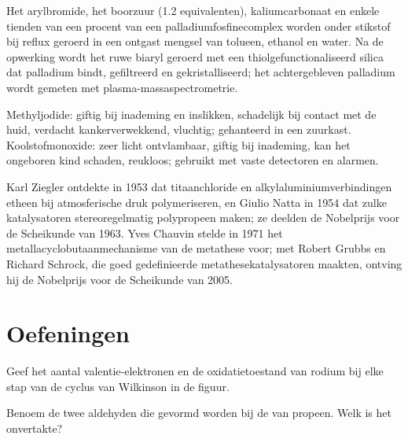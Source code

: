 \begin{inthelab}
Het arylbromide, het boorzuur (1.2 equivalenten), kaliumcarbonaat en
enkele tienden van een procent van een palladiumfosfinecomplex worden
onder stikstof bij reflux geroerd in een ontgast mengsel van tolueen,
ethanol en water. Na de opwerking wordt het ruwe biaryl geroerd met een
thiolgefunctionaliseerd silica dat palladium bindt, gefiltreerd en
gekristalliseerd; het achtergebleven palladium wordt gemeten met
plasma-massaspectrometrie.
\end{inthelab}

\begin{safety}{}
Methyljodide: giftig bij inademing en inslikken, schadelijk bij contact
met de huid, verdacht kankerverwekkend, vluchtig; gehanteerd in een
zuurkast. Koolstofmonoxide: zeer licht ontvlambaar, giftig bij
inademing, kan het ongeboren kind schaden, reukloos; gebruikt met vaste
detectoren en alarmen.
\end{safety}

\begin{history}
Karl Ziegler ontdekte in 1953 dat titaanchloride en
alkylaluminiumverbindingen etheen bij atmosferische druk polymeriseren,
en Giulio Natta in 1954 dat zulke katalysatoren stereoregelmatig
polypropeen maken; ze deelden de Nobelprijs voor de Scheikunde van 1963.
Yves Chauvin stelde in 1971 het metallacyclobutaanmechanisme van de
metathese voor; met Robert Grubbs en Richard Schrock, die goed
gedefinieerde metathesekatalysatoren maakten, ontving hij de Nobelprijs
voor de Scheikunde van 2005.
\end{history}

\section{Oefeningen}

\begin{exercise}[$\star$]\label{exo:b3:homogeneous-catalysis:1}
Geef het aantal valentie-elektronen en de oxidatietoestand van rodium bij
elke stap van de cyclus van Wilkinson in de figuur.
\end{exercise}

\begin{exercise}[$\star$]\label{exo:b3:homogeneous-catalysis:2}
Benoem de twee aldehyden die gevormd worden bij de  van
propeen. Welk is het onvertakte?
\end{exercise}

